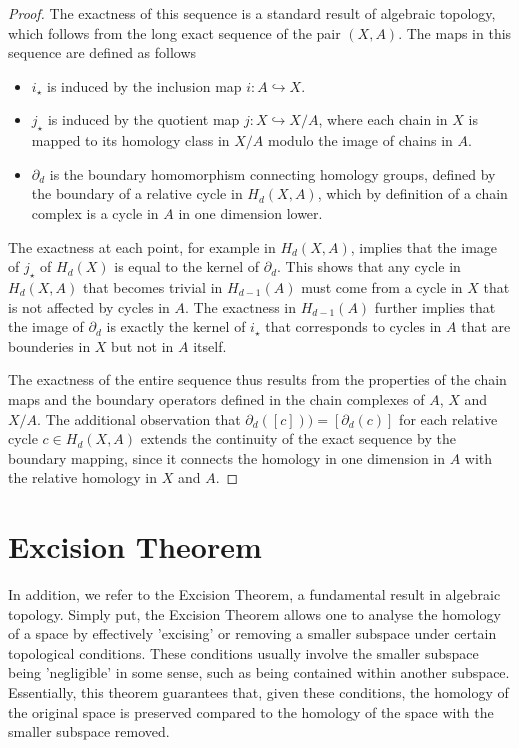 \begin{proof}
	The exactness of this sequence is a standard result of algebraic topology, which follows from the long exact sequence of the pair \((X, A)\). The maps in this sequence are defined as follows
	\begin{itemize}
		\item \(i_{\star}\) is induced by the inclusion map \(i: A \hookrightarrow X\).
		\item \(j_{\star}\) is induced by the quotient map \(j: X \hookrightarrow X/A\), where each chain in \(X\) is mapped to its homology class in \(X/A\) modulo the image of chains in \(A\).
		\item \(\partial_{d}\) is the boundary homomorphism connecting homology groups, defined by the boundary of a relative cycle in \(H_{d}(X, A)\), which by definition of a chain complex is a cycle in \(A\) in one dimension lower.
	\end{itemize}
	The exactness at each point, for example in \(H_{d}(X, A)\), implies that the image of \(j_{\star}\) of \(H_{d}(X)\) is equal to the kernel of \(\partial_{d}\). This shows that any cycle in \(H_{d}(X, A)\) that becomes trivial in \(H_{d-1}(A)\) must come from a cycle in \(X\) that is not affected by cycles in \(A\). The exactness in \(H_{d-1}(A)\) further implies that the image of \(\partial_{d}\) is exactly the kernel of \(i_{\star}\) that corresponds to cycles in \(A\) that are bounderies in \(X\) but not in \(A\) itself.
			
	The exactness of the entire sequence thus results from the properties of the chain maps and the boundary operators defined in the chain complexes of \(A\), \(X\) and \(X/A\). The additional observation that \(\partial_{d}([c])) = [\partial_{d}(c)]\) for each relative cycle \(c \in H_{d}(X, A)\) extends the continuity of the exact sequence by the boundary mapping, since it connects the homology in one dimension in \(A\) with the relative homology in \(X\) and \(A\).
\end{proof}


\section{Excision Theorem}
\label{ExcisionTheorem}
In addition, we refer to the Excision Theorem, a fundamental result in algebraic topology. Simply put, the Excision Theorem allows one to analyse the homology of a space by effectively 'excising' or removing a smaller subspace under certain topological conditions. These conditions usually involve the smaller subspace being 'negligible' in some sense, such as being contained within another subspace. Essentially, this theorem guarantees that, given these conditions, the homology of the original space is preserved compared to the homology of the space with the smaller subspace removed.

